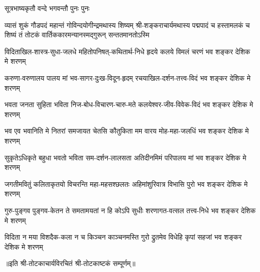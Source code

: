 

%
{सूत्रभाष्यकृतौ वन्दे भगवन्तौ पुनः पुनः}%

%
{व्यासं शुकं गौडपदं महान्तं गोविन्दयोगीन्द्रमथास्य शिष्यम्}%
{श्री-शङ्कराचार्यमथास्य पद्मपादं च हस्तामलकं च शिष्यं}%
{तं तोटकं वार्तिककारमन्यानस्मद्गुरून् सन्ततमानतोऽस्मि}%

\twolineshloka
{विदिताखिल-शास्त्र-सुधा-जलधे महितोपनिषत्-कथितार्थ-निधे}%
{हृदये कलये विमलं चरणं भव शङ्कर देशिक मे शरणम्}%


\twolineshloka
{करुणा-वरुणालय पालय मां भव-सागर-दुःख-विदून-हृदम्}%
{रचयाखिल-दर्शन-तत्त्व-विदं भव शङ्कर देशिक मे शरणम्}%


\twolineshloka
{भवता जनता सुहिता भविता निज-बोध-विचारण-चारु-मते}%
{कलयेश्वर-जीव-विवेक-विदं भव शङ्कर देशिक मे शरणम्}%


\twolineshloka
{भव एव भवानिति मे नितरां समजायत चेतसि कौतुकिता}%
{मम वारय मोह-महा-जलधिं भव शङ्कर देशिक मे शरणम्}%


\twolineshloka
{सुकृतेऽधिकृते बहुधा भवतो भविता सम-दर्शन-लालसता}%
{अतिदीनमिमं परिपालय मां भव शङ्कर देशिक मे शरणम्}%


\twolineshloka
{जगतीमवितुं कलिताकृतयो विचरन्ति महा-महसश्छलतः}%
{अहिमांशुरिवात्र विभासि पुरो भव शङ्कर देशिक मे शरणम्}%


\twolineshloka
{गुरु-पुङ्गव पुङ्गव-केतन ते समतामयतां न हि कोऽपि सुधीः}%
{शरणागत-वत्सल तत्त्व-निधे भव शङ्कर देशिक मे शरणम्}%


\twolineshloka
{विदिता न मया विशदैक-कला न च किञ्चन काञ्चनमस्ति गुरो}%
{द्रुतमेव विधेहि कृपां सहजां भव शङ्कर देशिक मे शरणम्}%


॥इति श्री-तोटकाचार्यविरचितं श्री-तोटकाष्टकं सम्पूर्णम्॥